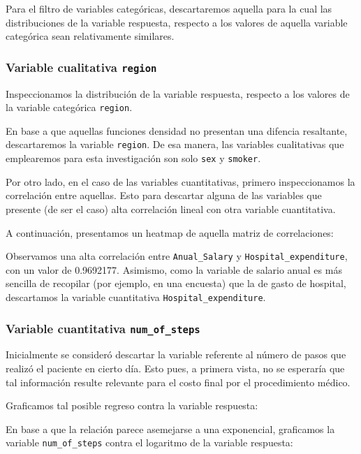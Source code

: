 \documentclass[
  letterpaper,
  DIV=11,
  numbers=noendperiod]{scrartcl}
\begin{document}
Para el filtro de variables categóricas, descartaremos aquella para la
cual las distribuciones de la variable respuesta, respecto a los valores
de aquella variable categórica sean relativamente similares.

\subsubsection{\texorpdfstring{Variable cualitativa
\texttt{region}}{Variable cualitativa region}}\label{variable-cualitativa-region}

Inspeccionamos la distribución de la variable respuesta, respecto a los
valores de la variable categórica \texttt{region}.

En base a que aquellas funciones densidad no presentan una difencia
resaltante, descartaremos la variable \texttt{region}. De esa manera,
las variables cualitativas que emplearemos para esta investigación son
solo \texttt{sex} y \texttt{smoker}.

Por otro lado, en el caso de las variables cuantitativas, primero
inspeccionamos la correlación entre aquellas. Esto para descartar alguna
de las variables que presente (de ser el caso) alta correlación lineal
con otra variable cuantitativa.

A continuación, presentamos un heatmap de aquella matriz de
correlaciones:

Observamos una alta correlación entre \texttt{Anual\_Salary} y
\texttt{Hospital\_expenditure}, con un valor de 0.9692177. Asimismo,
como la variable de salario anual es más sencilla de recopilar (por
ejemplo, en una encuesta) que la de gasto de hospital, descartamos la
variable cuantitativa \texttt{Hospital\_expenditure}.

\subsubsection{\texorpdfstring{Variable cuantitativa
\texttt{num\_of\_steps}}{Variable cuantitativa num\_of\_steps}}\label{variable-cuantitativa-num_of_steps}

Inicialmente se consideró descartar la variable referente al número de
pasos que realizó el paciente en cierto día. Esto pues, a primera vista,
no se esperaría que tal información resulte relevante para el costo
final por el procedimiento médico.

Graficamos tal posible regreso contra la variable respuesta:

En base a que la relación parece asemejarse a una exponencial,
graficamos la variable \texttt{num\_of\_steps} contra el logaritmo de la
variable respuesta:
\end{document}
